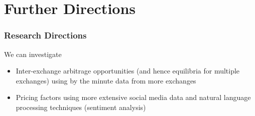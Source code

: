 \documentclass[9pt, compress]{beamer}
\begin{document}
\section{Further Directions}

\begin{frame}[fragile]
\frametitle{Research Directions}
We can investigate

\begin{itemize}
\item Inter-exchange arbitrage opportunities (and hence equilibria for multiple exchanges) using by the minute data from more exchanges
\item Pricing factors using more extensive social media data and natural language processing techniques (sentiment analysis)
\end{itemize}
\end{frame}
\end{document}
